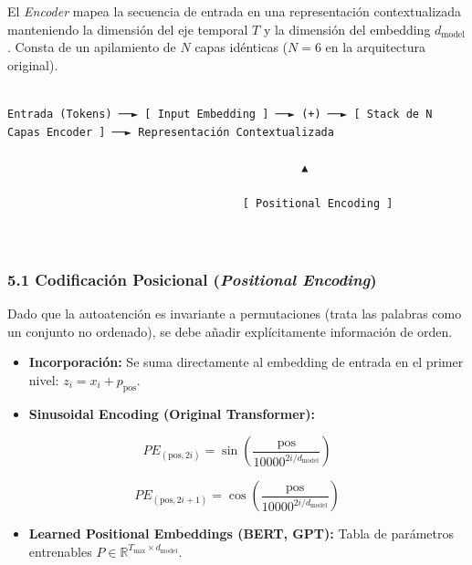 \documentclass[11pt,oneside]{article}
\begin{document}
El \emph{Encoder} mapea la secuencia de entrada en una representación contextualizada manteniendo la dimensión del eje temporal \(T\) y la dimensión del embedding \(d_{\text{model}}\). Consta de un apilamiento de \(N\) capas idénticas (\(N=6\) en la arquitectura original).

\begin{lstlisting}

Entrada (Tokens) ──► [ Input Embedding ] ──► (+) ──► [ Stack de N Capas Encoder ] ──► Representación Contextualizada

                                             ▲

                                    [ Positional Encoding ]



\end{lstlisting}

\subsubsection{5.1 Codificación Posicional (\emph{Positional Encoding})}

Dado que la autoatención es invariante a permutaciones (trata las palabras como un conjunto no ordenado), se debe añadir explícitamente información de orden.

\begin{itemize}

\item \textbf{Incorporación:} Se suma directamente al embedding de entrada en el primer nivel: \(z_i = x_i + p_{\text{pos}}\).

\end{itemize}

\begin{itemize}

\item \textbf{Sinusoidal Encoding (Original Transformer):}

\end{itemize}

\[PE_{(\text{pos}, 2i)} = \sin\left(\frac{\text{pos}}{10000^{2i / d_{\text{model}}}}\right)\]

\[PE_{(\text{pos}, 2i+1)} = \cos\left(\frac{\text{pos}}{10000^{2i / d_{\text{model}}}}\right)\]

\begin{itemize}

\item \textbf{Learned Positional Embeddings (BERT, GPT):} Tabla de parámetros entrenables \(P \in \mathbb{R}^{T_{\text{max}} \times d_{\text{model}}}\).

\end{itemize}
\end{document}
